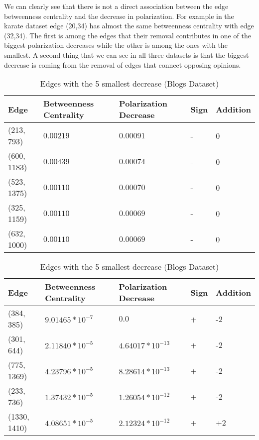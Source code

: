 We can clearly see that there is not a direct association between the edge betweenness centrality and the decrease in polarization. For example in the karate dataset edge (20,34) has almost the same betweenness centrality with edge (32,34). The first is among the edges that their removal contributes in one of the biggest polarization decreases while the other is among the ones with the smallest. A second thing that we can see in all three datasets is that the biggest decrease is coming from the removal of edges that connect opposing opinions.

\begin{table}[!htb]
 \centering
 \caption{Edges with the 5 largest decrease (Blogs Dataset)}
 \label{tab:edgesLargest}
 \begin{tabular}{| l || l | l | l | l |}
 \hline
  Edge & Betweenness Centrality & Polarization Decrease & Sign & Addition\\
  \hline
  \hline
  (213, 793) & $0.00219$ & $0.00091$ & - &  0\\
  \hline
  (600, 1183) & $0.00439$ & $0.00074$ & - &  0\\
  \hline
  (523, 1375) & $0.00110$ & $0.00070$ & - &  0\\
  \hline
  (325, 1159) & $0.00110$ & $0.00069$ & - &  0\\
  \hline
  (632, 1000) & $0.00110$ & $0.00069$ & - &  0\\
  \hline
 \end{tabular}
 
 \vspace{\floatsep}
 
 \caption{Edges with the 5 smallest decrease (Blogs Dataset)}
 \label{tab:edgesLargest}
 \begin{tabular}{| l || l | l | l | l |}
 \hline
  Edge & Betweenness Centrality & Polarization Decrease & Sign & Addition\\
  \hline
  \hline
  (384, 385) & $9.01465*10^{-7}$ & $0.0$ & + &  -2\\
  \hline
  (301, 644) & $2.11840*10^{-5}$ & $4.64017*10^{-13}$ & + &  -2\\
  \hline
  (775, 1369) & $4.23796*10^{-5}$ & $8.28614*10^{-13}$ & + &  -2\\
  \hline
  (233, 736) & $1.37432*10^{-5}$ & $1.26054*10^{-12}$ & + &  -2\\
  \hline
  (1330, 1410) & $4.08651*10^{-5}$ & $2.12324*10^{-12}$ & + &  +2\\
  \hline
  \hline
 \end{tabular}
 
\end{table}




